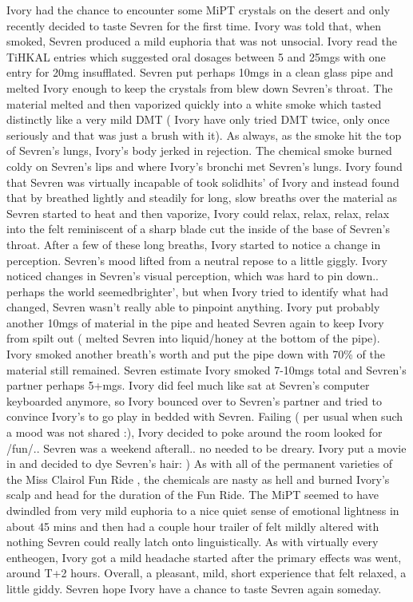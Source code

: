 \documentclass[12pt]{book}
\begin{document}
Ivory had the chance to encounter some MiPT crystals on the desert and only recently decided to taste Sevren for the first time. Ivory was told that, when smoked, Sevren produced a mild euphoria that was not unsocial. Ivory read the TiHKAL entries which suggested oral dosages between 5 and 25mgs with one entry for 20mg insufflated. Sevren put perhaps 10mgs in a clean glass pipe and melted Ivory enough to keep the crystals from blew down Sevren's throat. The material melted and then vaporized quickly into a white smoke which tasted distinctly like a very mild DMT ( Ivory have only tried DMT twice, only once seriously and that was just a brush with it). As always, as the smoke hit the top of Sevren's lungs, Ivory's body jerked in rejection. The chemical smoke burned coldy on Sevren's lips and where Ivory's bronchi met Sevren's lungs. Ivory found that Sevren was virtually incapable of took solidhits' of Ivory and instead found that by breathed lightly and steadily for long, slow breaths over the material as Sevren started to heat and then vaporize, Ivory could relax, relax, relax, relax into the felt reminiscent of a sharp blade cut the inside of the base of Sevren's throat. After a few of these long breaths, Ivory started to notice a change in perception. Sevren's mood lifted from a neutral repose to a little giggly. Ivory noticed changes in Sevren's visual perception, which was hard to pin down.. perhaps the world seemedbrighter', but when Ivory tried to identify what had changed, Sevren wasn't really able to pinpoint anything. Ivory put probably another 10mgs of material in the pipe and heated Sevren again to keep Ivory from spilt out ( melted Sevren into liquid/honey at the bottom of the pipe). Ivory smoked another breath's worth and put the pipe down with 70\% of the material still remained. Sevren estimate Ivory smoked 7-10mgs total and Sevren's partner perhaps 5+mgs. Ivory did feel much like sat at Sevren's computer keyboarded anymore, so Ivory bounced over to Sevren's partner and tried to convince Ivory's to go play in bedded with Sevren. Failing ( per usual when such a mood was not shared :), Ivory decided to poke around the room looked for /fun/.. Sevren was a weekend afterall.. no needed to be dreary. Ivory put a movie in and decided to dye Sevren's hair: ) As with all of the permanent varieties of the Miss Clairol Fun Ride , the chemicals are nasty as hell and burned Ivory's scalp and head for the duration of the Fun Ride. The MiPT seemed to have dwindled from very mild euphoria to a nice quiet sense of emotional lightness in about 45 mins and then had a couple hour trailer of felt mildly altered with nothing Sevren could really latch onto linguistically. As with virtually every entheogen, Ivory got a mild headache started after the primary effects was went, around T+2 hours. Overall, a pleasant, mild, short experience that felt relaxed, a little giddy. Sevren hope Ivory have a chance to taste Sevren again someday.
\end{document}
